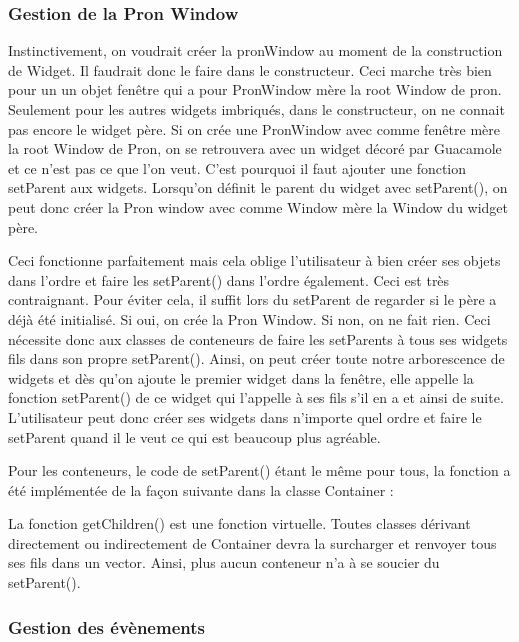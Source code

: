 \subsubsection{Gestion de la Pron Window}

Instinctivement, on voudrait créer la pronWindow au moment de la construction de Widget.
Il faudrait donc le faire dans le constructeur.
Ceci marche très bien pour un un objet fenêtre qui a pour PronWindow mère la root Window de pron.
Seulement pour les autres widgets imbriqués, dans le constructeur, on ne connait pas encore le widget père.
Si on crée une PronWindow avec comme fenêtre mère la root Window de Pron, on se retrouvera avec un widget décoré par Guacamole et ce n'est pas ce que l'on veut.
C'est pourquoi il faut ajouter une fonction setParent aux widgets.
Lorsqu'on définit le parent du widget avec setParent(), on peut donc créer la Pron window avec comme Window mère la Window du widget père.

Ceci fonctionne parfaitement mais cela oblige l'utilisateur à bien créer ses objets dans l'ordre et faire les setParent() dans l'ordre également.
Ceci est très contraignant.
Pour éviter cela, il suffit lors du setParent de regarder si le père a déjà été initialisé.
Si oui, on crée la Pron Window.
Si non, on ne fait rien.
Ceci nécessite donc aux classes de conteneurs de faire les setParents à tous ses widgets fils dans son propre setParent().
Ainsi, on peut créer toute notre arborescence de widgets et dès qu'on ajoute le premier widget dans la fenêtre, elle appelle la fonction setParent() de ce widget qui l'appelle à ses fils s'il en a et ainsi de suite.
L'utilisateur peut donc créer ses widgets dans n'importe quel ordre et faire le setParent quand il le veut ce qui est beaucoup plus agréable.

Pour les conteneurs, le code de setParent() étant le même pour tous, la fonction a été implémentée de la façon suivante dans la classe Container :



La fonction getChildren() est une fonction virtuelle. Toutes classes dérivant directement ou indirectement de Container devra la surcharger et renvoyer tous ses fils dans un vector. Ainsi, plus aucun conteneur n'a à se soucier du setParent().

\subsubsection{Gestion des évènements}

